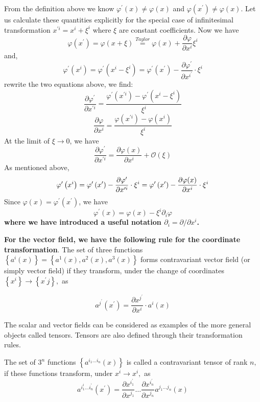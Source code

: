 \begin{example}
From the definition above we know $\varphi^{\prime}(x) \neq \varphi(x)$ and $\varphi\left(x^{\prime}\right) \neq \varphi(x)$. Let us calculate these quantities explicitly for the special case of infinitesimal transformation $x^{\prime i}=x^{i}+\xi^{i}$ where $\xi$ are constant coefficients. Now we have
$$
\varphi\left(x^{\prime}\right)=\varphi\left(x+\xi\right)\overset{Taylor}{=}\varphi(x)+\frac{\partial \varphi}{\partial x^{i}} \xi^{i}
$$
and,
$$
\varphi^{\prime}\left(x^{i}\right)=\varphi^{\prime}\left(x^{i}-\xi^{i}\right)=\varphi^{\prime}\left(x^{\prime}\right)-\frac{\partial \varphi^{\prime}}{\partial x^{i^{\prime}}} \cdot \xi^{i}
$$
rewrite the two equations above, we find:
$$
\frac{\partial \varphi^{\prime}}{\partial x^{\prime i}}=\frac{\varphi^{\prime}\left(x^{\prime i}\right)-\varphi^{\prime}\left(x^{i}-\xi^{i}\right)}{\xi^i}
$$
$$
\frac{\partial \varphi}{\partial x^{i}}=\frac{\varphi(x^{\prime i})-\varphi(x^i)}{\xi^i}
$$
At the limit of $\xi\rightarrow0$, we have
$$
\frac{\partial \varphi^{\prime}}{\partial x^{\prime i}}=\frac{\partial \varphi(x)}{\partial x^{i}}+\mathcal{O}(\xi)
$$
As mentioned above, 
$$
\varphi^{\prime}\left(x^{i}\right)=\varphi^{\prime}\left(x^{\prime}\right)-\frac{\partial \varphi^{\prime}}{\partial x^{\prime i}} \cdot \xi^{i}\\
=\varphi^{\prime}\left(x^{\prime}\right)-\frac{\partial \varphi(x)}{\partial x^{i}}\cdot\xi^i
$$
Since $\varphi(x)=\varphi^{\prime}\left(x^{\prime}\right)$, we have
$$
\varphi^{\prime}(x)=\varphi(x)-\xi^{i} \partial_{i} \varphi
$$
\textbf{where we have introduced a useful notation $\partial_{i}=\partial / \partial x^{i}$.}
\end{example}
\textbf{For the vector field, we have the following rule for the coordinate transformation}. The set of three functions $\left\{a^{i}(x)\right\}=\left\{a^{1}(x), a^{2}(x), a^{3}(x)\right\}$ forms contravariant vector field (or simply vector field) if they transform, under the change of coordinates $\left\{x^{i}\right\} \rightarrow\left\{x^{\prime} j\right\},$ as
\begin{qt}
\begin{equation}
a^{j^{\prime}}\left(x^{\prime}\right)=\frac{\partial x^{j^{\prime}}}{\partial x^{i}} \cdot a^{i}(x)
\end{equation}
\end{qt}
The scalar and vector fields can be considered as examples of the more general objects called tensors. Tensors are also defined through their transformation rules.
\begin{qt}
The set of $3^n$ functions $\left\{a^{i_{1} \ldots i_{n}}(x)\right\}$ is called a contravariant tensor of rank $n,$ if these functions transform, under $x^{i} \rightarrow x^{i},$ as
\begin{equation}
a^{i_{1}^{i} \ldots i_{n}^{\prime}}\left(x^{\prime}\right)=\frac{\partial x^{i_{1}^{\prime}}}{\partial x^{j_{1}}} \ldots \frac{\partial x^{i_{n}^{\prime}}}{\partial x^{j_{n}}} a^{j_{1} \ldots j_{n}}(x)
\end{equation}
\end{qt}

